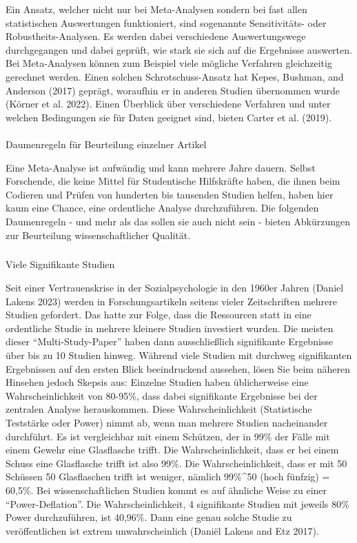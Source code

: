 \documentclass[
  letterpaper,
  DIV=11,
  numbers=noendperiod]{scrreprt}
\makeatletter
\let\oldparagraph\paragraph
\renewcommand{\paragraph}{
    \@ifstar
      \xxxParagraphStar
      \xxxParagraphNoStar
  }
\newcommand{\xxxParagraphStar}[1]{\oldparagraph*{#1}\mbox{}}
\newcommand{\xxxParagraphNoStar}[1]{\oldparagraph{#1}\mbox{}}
\let\oldsubparagraph\subparagraph
\renewcommand{\subparagraph}{
    \@ifstar
      \xxxSubParagraphStar
      \xxxSubParagraphNoStar
  }
\newcommand{\xxxSubParagraphStar}[1]{\oldsubparagraph*{#1}\mbox{}}
\newcommand{\xxxSubParagraphNoStar}[1]{\oldsubparagraph{#1}\mbox{}}
\makeatother
\begin{document}
Ein Ansatz, welcher nicht nur bei Meta-Analysen sondern bei fast allen
statistischen Auswertungen funktioniert, sind sogenannte Sensitivitäts-
oder Robustheits-Analysen. Es werden dabei verschiedene Auswertungswege
durchgegangen und dabei geprüft, wie stark sie sich auf die Ergebnisse
auswerten. Bei Meta-Analysen können zum Beispiel viele mögliche
Verfahren gleichzeitig gerechnet werden. Einen solchen
Schrotschuss-Ansatz hat Kepes, Bushman, and Anderson (2017) geprägt,
woraufhin er in anderen Studien übernommen wurde (Körner et al. 2022).
Einen Überblick über verschiedene Verfahren und unter welchen
Bedingungen sie für Daten geeignet sind, bieten Carter et al. (2019).

\paragraph{Daumenregeln für Beurteilung einzelner
Artikel}\label{daumenregeln-fuxfcr-beurteilung-einzelner-artikel}

Eine Meta-Analyse ist aufwändig und kann mehrere Jahre dauern. Selbst
Forschende, die keine Mittel für Studentische Hilfskräfte haben, die
ihnen beim Codieren und Prüfen von hunderten bis tausenden Studien
helfen, haben hier kaum eine Chance, eine ordentliche Analyse
durchzuführen. Die folgenden Daumenregeln - und mehr als das sollen sie
auch nicht sein - bieten Abkürzungen zur Beurteilung wissenschaftlicher
Qualität.

\subparagraph{Viele Signifikante
Studien}\label{viele-signifikante-studien}

Seit einer Vertrauenskrise in der Sozialpsychologie in den 1960er Jahren
(Daniel Lakens 2023) werden in Forschungsartikeln seitens vieler
Zeitschriften mehrere Studien gefordert. Das hatte zur Folge, dass die
Ressourcen statt in eine ordentliche Studie in mehrere kleinere Studien
investiert wurden. Die meisten dieser ``Multi-Study-Paper'' haben dann
ausschließlich signifikante Ergebnisse über bis zu 10 Studien hinweg.
Während viele Studien mit durchweg signifikanten Ergebnissen auf den
ersten Blick beeindruckend aussehen, lösen Sie beim näheren Hinsehen
jedoch Skepsis aus: Einzelne Studien haben üblicherweise eine
Wahrscheinlichkeit von 80-95\%, dass dabei signifikante Ergebnisse bei
der zentralen Analyse herauskommen. Diese Wahrscheinlichkeit
(Statistische Teststärke oder Power) nimmt ab, wenn man mehrere Studien
nacheinander durchführt. Es ist vergleichbar mit einem Schützen, der in
99\% der Fälle mit einem Gewehr eine Glasflasche trifft. Die
Wahrscheinlichkeit, dass er bei einem Schuss eine Glasflasche trifft ist
also 99\%. Die Wahrscheinlichkeit, dass er mit 50 Schüssen 50
Glasflaschen trifft ist weniger, nämlich 99\%\^{}50 (hoch fünfzig) =
60,5\%. Bei wissenschaftlichen Studien kommt es auf ähnliche Weise zu
einer ``Power-Deflation''. Die Wahrscheinlichkeit, 4 signifikante
Studien mit jeweils 80\% Power durchzuführen, ist 40,96\%. Dann eine
genau solche Studie zu veröffentlichen ist extrem unwahrscheinlich
(Daniël Lakens and Etz 2017).
\end{document}
